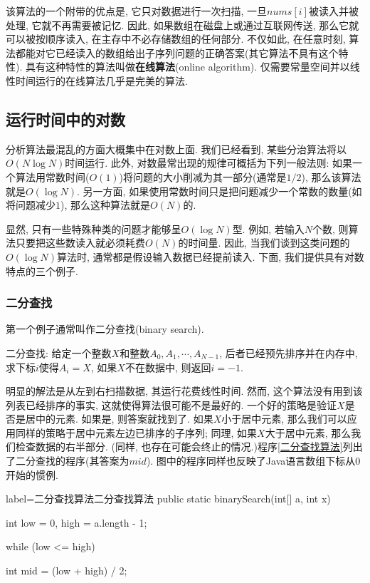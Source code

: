 \documentclass[oneside]{ctexbook}
\begin{document}
{该算法的一个附带的优点是, 它只对数据进行一次扫描, 一旦$nums[i]$被读入并被处理, 它就不再需要被记忆. 因此, 如果数组在磁盘上或通过互联网传送, 那么它就可以被按顺序读入, 在主存中不必存储数组的任何部分. 不仅如此, 在任意时刻, 算法都能对它已经读入的数组给出子序列问题的正确答案(其它算法不具有这个特性). 具有这种特性的算法叫做\textbf{在线算法}(online algorithm). 仅需要常量空间并以线性时间运行的在线算法几乎是完美的算法.

\subsection{运行时间中的对数}

分析算法最混乱的方面大概集中在对数上面. 我们已经看到, 某些分治算法将以$O(N\log{N})$时间运行. 此外, 对数最常出现的规律可概括为下列一般法则: 如果一个算法用常数时间($O(1)$)将问题的大小削减为其一部分(通常是$1/2$), 那么该算法就是$O(\log{N})$. 另一方面, 如果使用常数时间只是把问题减少一个常数的数量(如将问题减少$1$), 那么这种算法就是$O(N)$的.

显然, 只有一些特殊种类的问题才能够呈$O(\log{N})$型. 例如, 若输入$N$个数, 则算法只要把这些数读入就必须耗费$O(N)$的时间量. 因此, 当我们谈到这类问题的$O(\log{N})$算法时, 通常都是假设输入数据已经提前读入. 下面, 我们提供具有对数特点的三个例子.

\subsubsection{二分查找}

第一个例子通常叫作二分查找(binary search).

二分查找: 给定一个整数$X$和整数$A_0, A_1, \cdots, A_{N-1}$, 后者已经预先排序并在内存中, 求下标$i$使得$A_i=X$, 如果$X$不在数据中, 则返回$i=-1$.

明显的解法是从左到右扫描数据, 其运行花费线性时间. 然而, 这个算法没有用到该列表已经排序的事实, 这就使得算法很可能不是最好的. 一个好的策略是验证$X$是否是居中的元素. 如果是, 则答案就找到了. 如果$X$小于居中元素, 那么我们可以应用同样的策略于居中元素左边已排序的子序列; 同理, 如果$X$大于居中元素, 那么我们检查数据的右半部分. (同样, 也存在可能会终止的情况.)程序\ref{二分查找算法}列出了二分查找的程序(其答案为$mid$). 图中的程序同样也反映了Java语言数组下标从0开始的惯例.

\begin{myjava}{label={二分查找算法}}{二分查找算法}
public static binarySearch(int[] a, int x) {
    int low = 0, high = a.length - 1;

    while (low <= high) {
        int mid = (low + high) / 2;

}}
\end{myjava}}
\end{document}
